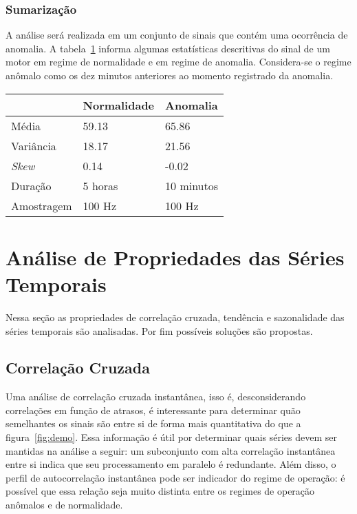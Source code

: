 \subsubsection{Sumarização}

A análise será realizada em um conjunto de sinais que contém uma ocorrência de
anomalia. A tabela~\ref{tab:summ} informa algumas estatísticas descritivas do
sinal de um motor em regime de normalidade e em regime de anomalia.
Considera-se o regime anômalo como os dez minutos anteriores ao momento
registrado da anomalia.

\begin{table}[H]
\label{tab:summ}
\begin{tabular}{|l|l|l|}
\hline
           & \textbf{Normalidade} & \textbf{Anomalia} \\ \hline
Média      & 59.13                &  65.86            \\ \hline
Variância  & 18.17                &  21.56            \\ \hline
\emph{Skew}& 0.14                 &  -0.02            \\ \hline
Duração    & 5 horas              &  10 minutos       \\ \hline
Amostragem &  100 Hz              &  100 Hz           \\ \hline
\end{tabular}
\end{table}

\section{Análise de Propriedades das Séries Temporais}

Nessa seção as propriedades de correlação cruzada, tendência e sazonalidade
das séries temporais são analisadas. Por fim possíveis soluções são propostas.

\subsection{Correlação Cruzada}\label{ssec:ccorr}

Uma análise de correlação cruzada instantânea, isso é, desconsiderando
correlações em função de atrasos, é interessante para determinar quão
semelhantes os sinais são entre si de forma mais quantitativa do que a
figura~\ref{fig:demo}. Essa informação é útil por determinar quais séries devem
ser mantidas na análise a seguir: um subconjunto com alta correlação
instantânea entre si indica que seu processamento em paralelo é redundante.
Além disso, o perfil de autocorrelação instantânea pode ser indicador do regime
de operação: é possível que essa relação seja muito distinta entre os regimes
de operação anômalos e de normalidade.

